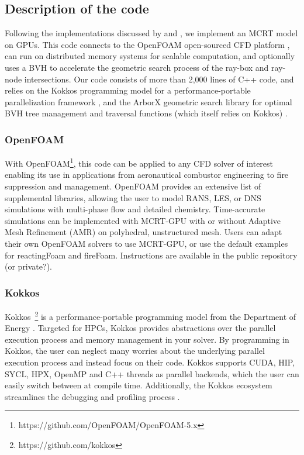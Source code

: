 \subsection{Description of the code}
Following the implementations discussed by \citet{Silvestri2019ASimulation} and \citet{Humphrey2015ATracing}, we implement an MCRT model on GPUs. 
This code connects to the OpenFOAM open-sourced CFD platform \cite{Weller1998ATechniques}, can run on distributed memory systems for scalable computation, and optionally uses a BVH to accelerate the geometric search process of the ray-box and ray-node intersections.
Our code consists of more than 2,000 lines of C++ code, and relies on the Kokkos programming model for a performance-portable parallelization framework \cite{Trott2021KokkosEra}, and the ArborX geometric search library for optimal BVH tree management and traversal functions (which itself relies on Kokkos) \cite{Lebrun-Grandie2019ArborX:Library}.


\subsubsection{OpenFOAM}
With OpenFOAM\footnote{https://github.com/OpenFOAM/OpenFOAM-5.x}, this code can be applied to any CFD solver of interest enabling its use in applications from aeronautical combustor engineering to fire suppression and management. OpenFOAM provides an extensive list of supplemental libraries, allowing the user to model RANS, LES, or DNS simulations with multi-phase flow and detailed chemistry. 
Time-accurate simulations can be implemented with MCRT-GPU with or without Adaptive Mesh Refinement (AMR) on polyhedral, unstructured mesh.
Users can adapt their own OpenFOAM solvers to use MCRT-GPU, or use the default examples for reactingFoam and fireFoam. Instructions are available in the public repository (or private?).

\subsubsection{Kokkos}
Kokkos~\footnote{https://github.com/kokkos} is a performance-portable programming model from the Department of Energy \cite{Trott_Kokkos3_2022,TrottKokkosOGPaper2014}. 
Targeted for HPCs, Kokkos provides abstractions over the parallel execution process and memory management in your solver. By programming in Kokkos, the user can neglect many worries about the underlying parallel execution process and instead focus on their code.
Kokkos supports CUDA, HIP, SYCL, HPX, OpenMP and C++ threads as parallel backends, which the user can easily switch between at compile time.
Additionally, the Kokkos ecosystem streamlines the debugging and profiling process \cite{Trott_KokkosEcosystem2021}.

